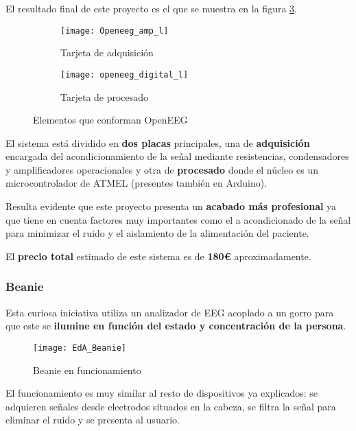 El resultado final de este proyecto es el que se muestra en la figura \ref{fig:OpenEEG}.

\begin{figure}[h]
  \centering
  \begin{subfigure}[b]{6.5cm}
   	\centering
    \texttt{[image: Openeeg\_amp\_l]}
    \caption{Tarjeta de adquisición}
    \label{fig:Openeeg_amp_l}
  \end{subfigure}
  \begin{subfigure}[b]{6.5cm}
  	\centering
    \texttt{[image: openeeg\_digital\_l]}
    \caption{Tarjeta de procesado}
    \label{fig:openeeg_digital_l}
  \end{subfigure}
  \caption{Elementos que conforman OpenEEG \cite{OpenEEG}}
  \label{fig:OpenEEG}
\end{figure}

El sistema está dividido en \textbf{dos placas} principales, una de \textbf{adquisición} encargada del acondicionamiento de la señal mediante resistencias, condensadores y amplificadores operacionales y otra de \textbf{procesado} donde el núcleo es un microcontrolador de ATMEL (presentes también en Arduino). 

Resulta evidente que este proyecto presenta un \textbf{acabado más profesional} ya que tiene en cuenta factores muy importantes como el a acondicionado de la señal para minimizar el ruido y el aislamiento de la alimentación del paciente.

El \textbf{precio total} estimado de este sistema es de \textbf{180€} aproximadamente.

\subsubsection{Beanie}

Esta curiosa iniciativa utiliza un analizador de \acrshort{EEG} acoplado a un gorro para que este se \textbf{ilumine en función del estado y concentración de la persona}.

\begin{figure} [h]
    \centering
    \texttt{[image: EdA\_Beanie]}
    \caption{Beanie en funcionamiento \cite{beanie}}
    \label{fig:EdA_Beanie}
\end{figure}

El funcionamiento es muy similar al resto de dispositivos ya explicados: se adquieren señales desde electrodos situados en la cabeza, se filtra la señal para eliminar el ruido y se presenta al usuario.

